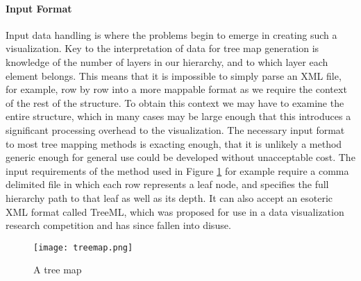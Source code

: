 \paragraph{Input Format}
Input data handling is where the problems begin to emerge in creating such a visualization. Key to the interpretation of data for tree map generation is knowledge of the number of layers in our hierarchy, and to which layer each element belongs. This means that it is impossible to simply parse an XML file, for example, row by row into a more mappable format as we require the context of the rest of the structure. To obtain this context we may have to examine the entire structure, which in many cases may be large enough that this introduces a significant processing overhead to the visualization. The necessary input format to most tree mapping methods is exacting enough, that it is unlikely a method generic enough for general use could be developed without unacceptable cost. The input requirements of the method used in Figure \ref{fig:treemap} for example require a comma delimited file in which each row represents a leaf node, and specifies the full hierarchy path to that leaf as well as its depth. It can also accept an esoteric XML format called TreeML, which was proposed for use in a data visualization research competition \citep{PlaisantCFekete2008} and has since fallen into disuse. 

\begin{figure}
	\centering
	\texttt{[image: treemap.png]}
	\caption{A tree map}
	\label{fig:treemap}
\end{figure}
